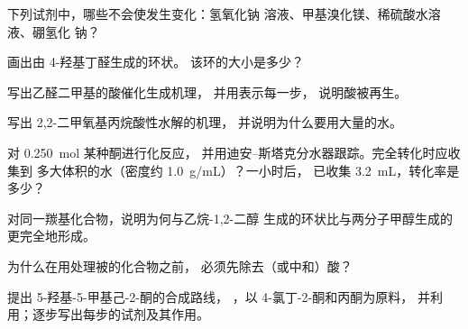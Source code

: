 \begin{exercise}[$\star$]\label{exo:b1:acetals-protection:3}
下列试剂中，哪些不会使发生变化：氢氧化钠
溶液、甲基溴化镁、稀硫酸水溶液、硼氢化
钠？
\end{exercise}

\begin{exercise}[$\star$]\label{exo:b1:acetals-protection:4}
画出由 4-羟基丁醛生成的环状。
该环的大小是多少？
\end{exercise}

\begin{exercise}[$\star\star$]\label{exo:b1:acetals-protection:5}
写出乙醛二甲基的酸催化生成机理，
并用表示每一步，
说明酸被再生。
\end{exercise}

\begin{exercise}[$\star\star$]\label{exo:b1:acetals-protection:6}
写出 2,2-二甲氧基丙烷酸性水解的机理，
并说明为什么要用大量的水。
\end{exercise}

\begin{exercise}[$\star\star$]\label{exo:b1:acetals-protection:7}
对 \qty{0.250}{mol} 某种酮进行化反应，
并用迪安–斯塔克分水器跟踪。完全转化时应收集到
多大体积的水（密度约 \qty{1.0}{g/mL}）？一小时后，
已收集 \qty{3.2}{mL}，转化率是多少？
\end{exercise}

\begin{exercise}[$\star\star$]\label{exo:b1:acetals-protection:8}
对同一羰基化合物，说明为何与乙烷-1,2-二醇
生成的环状比与两分子甲醇生成的
更完全地形成。
\end{exercise}

\begin{exercise}[$\star\star$]\label{exo:b1:acetals-protection:9}
为什么在用处理被的化合物之前，
必须先除去（或中和）酸？
\end{exercise}

\begin{exercise}[$\star\star\star$]\label{exo:b1:acetals-protection:10}
提出 5-羟基-5-甲基己-2-酮的合成路线，
，以 4-氯丁-2-酮和丙酮为原料，
并利用；逐步写出每步的试剂及其作用。
\end{exercise}

